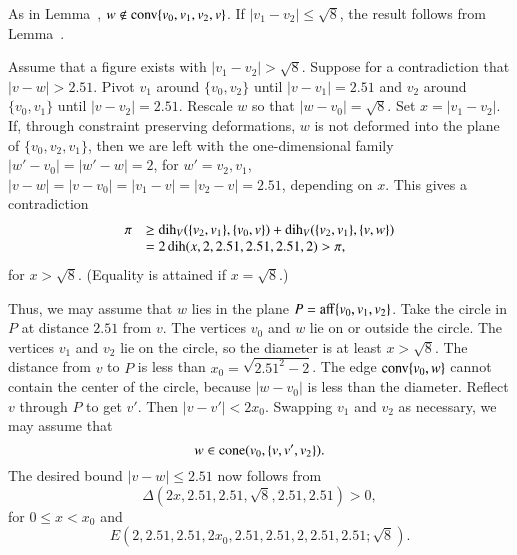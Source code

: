 \begin{tarskidata}
\begin{tarski}
\begin{proved}  As in Lemma~, 
$w\not\in{\operatorname{conv}}\{v_0,v_1,v_2,v\}$.  
If $|v_1-v_2|\le \sqrt{8}$, the result follows from
Lemma~. 

Assume that a figure exists with $|v_1-v_2|>\sqrt{8}$. Suppose for a
contradiction that $|v-w|>2.51$.    Pivot $v_1$ around $\{v_0,v_2\}$ until
$|v-v_1|=2.51$ and $v_2$ around $\{v_0,v_1\}$ until $|v-v_2|=2.51$.  Rescale
$w$ so that $|w-v_0|=\sqrt{8}$. Set $x = |v_1-v_2|$. If, through constraint
preserving deformations, $w$ is not deformed into the plane of 
$\{v_0,v_2,v_1\}$,
then we are left with the one-dimensional family $|w'-v_0|=|w'-w|=2$, for
$w'=v_2,v_1$, $|v-w|=|v-v_0|=|v_1-v|=|v_2-v|=2.51$, depending on  $x$. This
gives a contradiction
    $$
    \begin{array}{lll}
        \pi &\ge \operatorname{dih}_V(\{v_2,v_1\},\{v_0,v\}) + \operatorname{dih}_V(\{v_2,v_1\},\{v,w\})\\
        &= 2\operatorname{dih}(x,2,2.51,2.51,2.51,2)
         > \pi,
    \end{array}
    $$
for $x>\sqrt{8}$.
(Equality is attained if $x=\sqrt{8}$.)

Thus, we may assume that $w$ lies in the plane $P={\operatorname{aff}}\{v_0,v_1,v_2\}$. Take the
circle in $P$ at distance $2.51$ from $v$. The vertices $v_0$ and $w$ lie
on or outside the circle. The vertices $v_1$ and $v_2$ lie on the
circle, so the diameter is at least $x>\sqrt{8}$.  The distance from
$v$ to $P$ is less than $x_0= \sqrt{2.51^2-2}$.  The edge 
${\operatorname{conv}}\{v_0,w\}$ cannot
contain the center of the circle, because $|w-v_0|$ is less than the
diameter.
%
Reflect $v$ through $P$ to get $v'$.  Then $|v-v'|< 2x_0$. Swapping
$v_1$ and $v_2$ as necessary, we may assume that 
  $$w\in{\operatorname{cone}}(v_0,\{v,v',v_2\}).$$  
The desired bound $|v-w|\le 2.51$ now follows from
  $$
  \Delta(2x,2.51,2.51,\sqrt8,2.51,2.51)>0,
  $$
for $0\le x< x_0$ and
  $$
  E(2,2.51,2.51,2x_0,2.51,2.51,2,2.51,2.51; \sqrt8).
  $$
\swallowed\end{proved}
\end{tarski}







\begin{tarski}


\end{tarski}
\end{tarskidata}
